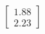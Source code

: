 \documentclass[preview]{standalone}
\begin{document}
\begin{align*}
\begin{bmatrix} 1.88 \\ 2.23 \end{bmatrix}
\end{align*}
\end{document}
